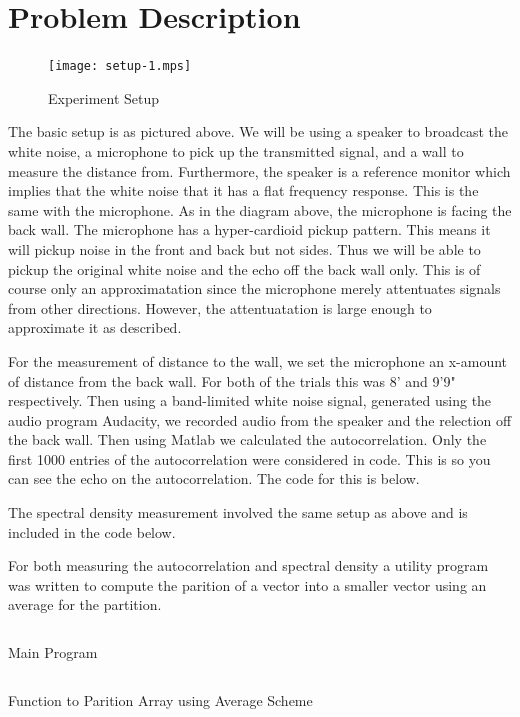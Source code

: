 \documentclass{article}
\begin{document}
      \section{Problem Description}
      \begin{figure}[H]
         \texttt{[image: setup-1.mps]}
         \caption{Experiment Setup}
      \end{figure}
      The basic setup is as pictured above. We will be using a speaker to
      broadcast the white noise, a microphone to pick up the transmitted signal,
      and a wall to measure the distance from. Furthermore, the speaker is
      a reference monitor which implies that the white noise that it has
      a flat frequency response. This is the same with the microphone.
      As in the diagram above, the microphone is facing the back wall. The
      microphone has a hyper-cardioid pickup pattern. This means it will
      pickup noise in the front and back but not sides. Thus we will be
      able to pickup the original white noise and the echo off the back
      wall only. This is of course only an approximatation since the microphone
      merely attentuates signals from other directions. However, the
      attentuatation is large enough to approximate it as described.

      For the measurement of distance to the wall, we set the microphone
      an x-amount of distance from the back wall. For both of the trials this
      was 8' and 9'9" respectively. Then using a band-limited white noise
      signal, generated using the audio program Audacity, we recorded audio
      from the speaker and the relection off the back wall. Then using Matlab
      we calculated the autocorrelation. Only the first 1000 entries of the
      autocorrelation were considered in code. This is so you can see the
      echo on the autocorrelation.
      The code for this is below.

      The spectral density measurement involved the same setup as above
      and is included in the code below.

      For both measuring the autocorrelation and spectral density a
      utility program was written to compute the parition of a vector
      into a smaller vector using an average for the partition.

      \begin{listing}[H]
         \inputminted[linenos]{matlab}{../main.m}
         \caption{Main Program}
      \end{listing}
      \begin{listing}[H]
         \inputminted[linenos]{matlab}{../partition.m}
         \caption{Function to Parition Array using Average Scheme}
      \end{listing}
\end{document}
